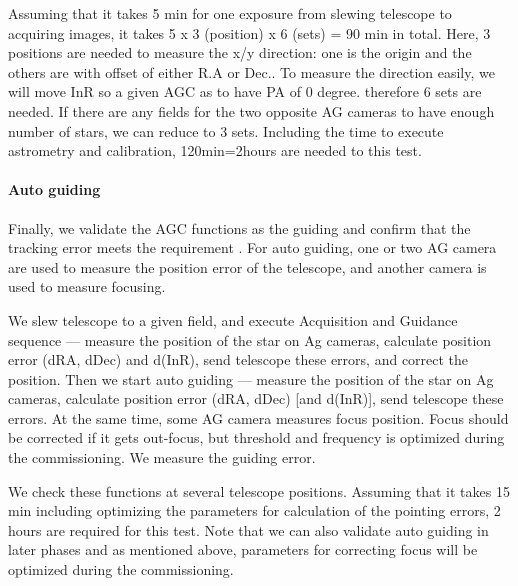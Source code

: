 Assuming that it takes 5 min for one exposure from slewing telescope to acquiring images, 
it takes 5 x 3 (position) x 6 (sets) = 90 min in total.
Here, 3 positions are needed  to measure the x/y  direction: one is the origin and the others are with offset of either R.A or Dec..
To measure the direction easily, we will move InR so a given AGC as to have PA of 0 degree.
therefore 6 sets are needed.
If there are any fields for the two opposite AG cameras to have enough number of stars, we can reduce to 3 sets.
Including the time to execute astrometry and calibration, 120min=2hours are needed to this test.


\paragraph{Auto guiding}
Finally, we validate the AGC functions as the guiding and confirm that the tracking error meets the requirement .
For auto guiding, one or two AG camera are used to measure the position error of the telescope, and another camera is used to measure focusing.

We slew telescope to a given field, and execute Acquisition and Guidance sequence --- measure the position of the star on Ag cameras, calculate position error (dRA, dDec) and d(InR), send telescope these errors, and correct the position.
Then we start auto guiding --- measure the position of the star on Ag cameras, calculate position error (dRA, dDec) [and d(InR)], send telescope these errors.
At the same time, some AG camera measures focus position.
Focus should be corrected if it gets out-focus, but threshold and frequency is optimized during the commissioning.
We measure the guiding error.



We check these functions at several telescope positions.
Assuming that it takes 15 min including optimizing the parameters for calculation of the pointing errors, 2 hours are required for this test.
Note that we can also validate auto guiding in later phases and as mentioned above, parameters for correcting focus will be optimized during the commissioning.

